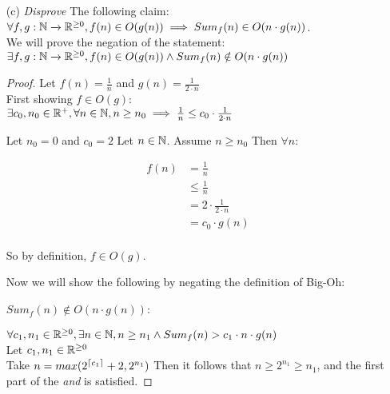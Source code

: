 \documentclass[12pt, a4paper]{amsart}
\theoremstyle{definition}
\theoremstyle{remark}
\numberwithin{Theorem}{section}
\begin{document}
\begin{enumerate}
\begin{proof}
    Thus $P(k + 1)$ follows from $P(k)$, and this completes the induction step. Having
    proved steps 1 and 2, we can conclude by the Principle of Mathematical Induction
    that $P(n)$ is true for all natural numbers $n$.
    \end{proof}
     
    \newpage
     
     \item[(c)]
     \emph{Disprove} The following claim: \\
     $\forall f, g: \mathbb N \xrightarrow{} \mathbb R^{\geq 0}, f(n) \in O(g(n)) \implies Sum_f(n) \in O(n\cdot g(n))$. \\
     
     We will prove the negation of the statement: \\
     $\exists f, g: \mathbb N \xrightarrow{} \mathbb R^{\geq 0}, f(n) \in O(g(n)) \land Sum_f(n) \notin O(n\cdot g(n))$ \\
     
    \begin{proof} 
    Let $f(n) = \frac{1}{n}$ and $g(n) = \frac{1}{2 \cdot n}$ \\
    
    First showing $f \in O(g)$: \\
     $\exists c_0, n_0 \in \mathbb R^{+}, \forall n \in \mathbb N, n \geq n_0 \implies \frac{1}{n} \leq c_0 \cdot \frac{1}{2 \cdot n}$
    
    Let $n_0 = 0$ and $c_0 = 2$
    Let $n \in \mathbb N$.
    Assume $n \geq n_0$
    Then $\forall n$:
    
\begin{align*}
    f(n) &= \frac{1}{n} \\
    &\leq \frac{1}{n} \\
    &= 2 \cdot \frac{1}{2 \cdot n} \\
    &= c_0 \cdot g(n)
\end{align*} \\
    
    So by definition,  $f \in O(g)$.
    
    Now we will show the following by negating the definition of Big-Oh:
    
    $Sum_f(n) \notin O(n\cdot g(n))$:
    
    $\forall c_1, n_1 \in \mathbb R^{\geq 0}, \exists n \in \mathbb N, n \geq n_1 \land Sum_f (n) > c_1 \cdot n \cdot g(n)$ \\
    
    
    Let $c_1, n_1 \in \mathbb R^{\geq 0}$ \\
    Take $n = max(2^{\left \lceil c_1 \right \rceil} + 2, 2^{n_1})$
    Then it follows that $n \geq 2^{n_1} \geq n_1$, and the first part of the \emph{and} is satisfied.
    

\end{proof}
\end{enumerate}
\end{document}
